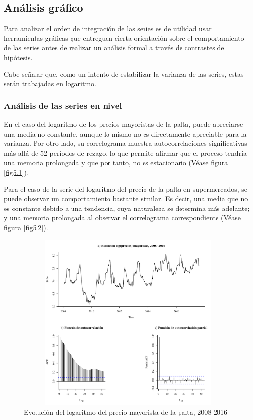 \documentclass[12pt, twoside]{book}\usepackage[]{graphicx}\usepackage[]{color}
\newenvironment{knitrout}{}{} %
\numberwithin{equation}{section}
\numberwithin{theorem}{section}
\numberwithin{teorema}{section}
\numberwithin{defi}{section}
\numberwithin{prop}{section}
\numberwithin{defi}{section}
\theoremstyle{plain}
\begin{document}
\subsection{Análisis gráfico}

Para analizar el orden de integración de las series es de utilidad usar herramientas gráficas que entreguen cierta orientación sobre el comportamiento de las series antes de realizar un análisis formal a través de contrastes de hipótesis. 

Cabe señalar que, como un intento de estabilizar la varianza de las series, estas serán trabajadas en logaritmo.

\subsubsection{Análisis de las series en nivel}

En el caso del logaritmo de los precios mayoristas de la palta, puede apreciarse una media no constante, aunque lo mismo no es directamente apreciable  para la varianza. Por otro lado, su correlograma muestra autocorrelaciones significativas más allá de 52 períodos de rezago, lo que permite afirmar que el proceso tendría una memoria prolongada y que por tanto, no es estacionario (Véase figura \ref{fig5.1}).

Para el caso de la serie del logaritmo del precio de la palta en supermercados, se puede observar un comportamiento bastante similar. Es decir, una media que no es constante debido a una tendencia, cuya naturaleza se determina más adelante; y una memoria prolongada al observar el correlograma correspondiente (Véase figura \ref{fig5.2}).  


\begin{knitrout}
\color{fgcolor}\begin{figure}[H]

{\centering \includegraphics[width=4.5in,height=3.5in]{figure/fig-2_1-1} 

}

\caption{Evolución del logaritmo del precio mayorista de la palta, 2008-2016\label{fig5.1}}\label{fig:fig-2.1}
\end{figure}


\end{knitrout}
\end{document}
